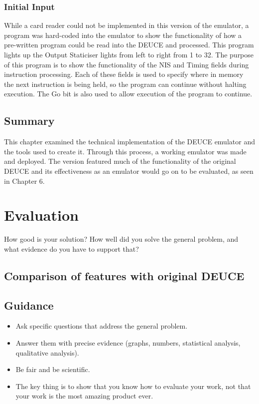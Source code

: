 \documentclass{l4proj}
\begin{document}
\subsection{Initial Input}
While a card reader could not be implemented in this version of the emulator, a program was hard-coded into the emulator to show the functionality of how a pre-written program could be read into the DEUCE and processed. This program lights up the Output Staticiser lights from left to right from 1 to 32. The purpose of this program is to show the functionality of the NIS and Timing fields during instruction processing. Each of these fields is used to specify where in memory the next instruction is being held, so the program can continue without halting execution. The Go bit is also used to allow execution of the program to continue.

\section{Summary}
This chapter examined the technical implementation of the DEUCE emulator and the tools used to create it. Through this process, a working emulator was made and deployed. The version featured much of the functionality of the original DEUCE and its effectiveness as an emulator would go on to be evaluated, as seen in Chapter 6.

\chapter{Evaluation} 
How good is your solution? How well did you solve the general problem, and what evidence do you have to support that?
\section{Comparison of features with original DEUCE}
\section{Guidance}
\begin{itemize}
    \item
        Ask specific questions that address the general problem.
    \item
        Answer them with precise evidence (graphs, numbers, statistical
        analysis, qualitative analysis).
    \item
        Be fair and be scientific.
    \item
        The key thing is to show that you know how to evaluate your work, not
        that your work is the most amazing product ever.
\end{itemize}
\end{document}
